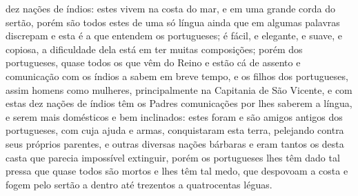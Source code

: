 dez nações de índios: estes vivem na costa do mar, e em uma grande
corda do sertão, porém são todos estes de uma só língua ainda que em
algumas palavras discrepam e esta é a que entendem os portugueses; é
fácil, e elegante, e suave, e copiosa, a dificuldade dela está em ter
muitas composições; porém dos portugueses, quase todos os que vêm do
Reino e estão cá de assento e comunicação com os índios a sabem em
breve tempo, e os filhos dos portugueses, assim homens como mulheres,
principalmente na Capitania de São Vicente, e com estas dez nações de
índios têm os Padres comunicações por lhes saberem a língua, e serem
mais domésticos e bem inclinados: estes foram e são amigos antigos dos
portugueses, com cuja ajuda e armas, conquistaram esta terra, pelejando
contra seus próprios parentes, e outras diversas nações bárbaras e eram
tantos os desta casta que parecia impossível extinguir, porém os
portugueses lhes têm dado tal pressa que quase todos são mortos e lhes
têm tal medo, que despovoam a costa e fogem pelo sertão a dentro até
trezentos a quatrocentas léguas.

